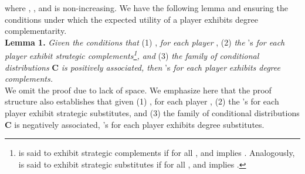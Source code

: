 \documentclass[letterpaper,12pt,onecolumn, nodraft]{IEEEtran}
\begin{document}
where , , and  is non-increasing. We have the following lemma and ensuring the conditions under which the expected utility of a player exhibits degree complementarity. \\  
\textbf{Lemma 1.}  \emph{Given the conditions that} (1) , \emph{for each player} , (2) \emph{the} 's \emph{for each player}  \emph{exhibit strategic complements\footnote{ is said to exhibit strategic complements \cite{hv} if for all ,  and  implies . Analogously,  is said to exhibit strategic substitutes \cite{hv} if for all ,  and  implies .}, and} (3) \emph{the family of conditional distributions} \textbf{C} \emph{is positively associated, then} 's \emph{for each player}  \emph{exhibits degree complements.}  \\ 

We omit the proof due to lack of space. We emphasize here that the proof structure also establishes that given (1) , for each player , (2) the 's for each player  exhibit strategic substitutes, and (3) the family of conditional distributions \textbf{C} is negatively associated, 's for each player  exhibits degree substitutes.
\end{document}
